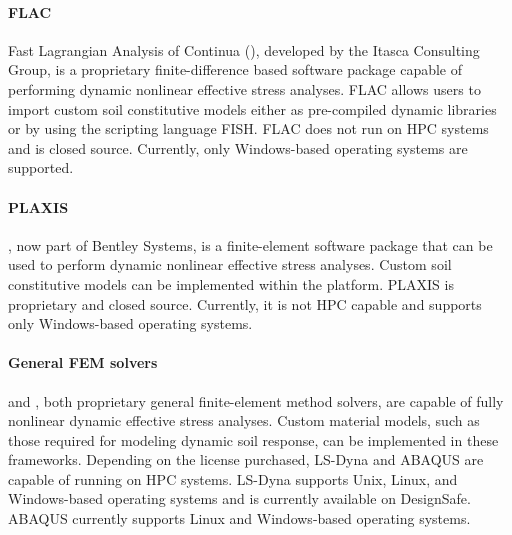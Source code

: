 \paragraph{FLAC}
Fast Lagrangian Analysis of Continua (), developed by the Itasca Consulting Group, is a proprietary finite-difference based software package capable of performing dynamic nonlinear effective stress analyses. FLAC allows users to import custom soil constitutive models either as pre-compiled dynamic libraries or by using the scripting language FISH. FLAC does not run on HPC systems and is closed source. Currently, only Windows-based operating systems are supported.

\paragraph{PLAXIS}
, now part of Bentley Systems, is a finite-element software package that can be used to perform dynamic nonlinear effective stress analyses. Custom soil constitutive models can be implemented within the platform. PLAXIS is proprietary and closed source. Currently, it is not HPC capable and supports only Windows-based operating systems.

\paragraph{General FEM solvers}
 and , both proprietary general finite-element method solvers, are capable of fully nonlinear dynamic effective stress analyses. Custom material models, such as those required for modeling dynamic soil response, can be implemented in these frameworks. Depending on the license purchased, LS-Dyna and ABAQUS are capable of running on HPC systems. LS-Dyna supports Unix, Linux, and Windows-based operating systems and is currently available on DesignSafe. ABAQUS currently supports Linux and Windows-based operating systems.




